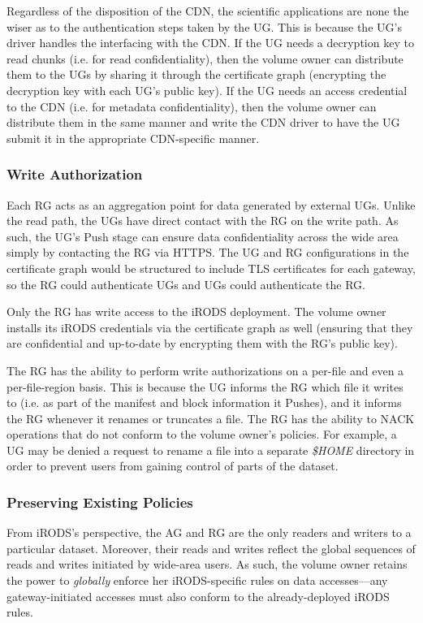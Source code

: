 Regardless of the disposition of the CDN, the scientific applications are none
the wiser as to the authentication steps taken by the UG.  This is
because the UG's driver handles the interfacing with the CDN.  If the
UG needs a decryption key to read chunks (i.e. for read confidentiality), then
the volume owner can distribute them to the UGs by sharing it through the
certificate graph (encrypting the decryption key with each UG's public key).  If
the UG needs an access credential to the CDN (i.e. for metadata
confidentiality), then the volume owner can distribute them in the same manner
and write the CDN driver to have the UG submit it in the appropriate
CDN-specific manner.

\subsubsection{Write Authorization}

Each RG acts as an aggregation point for data generated by external UGs.
Unlike the read path, the UGs have direct contact with the RG on the write path.
As such, the UG's Push stage can ensure data confidentiality across the wide
area simply by contacting the RG via HTTPS.  The UG and RG configurations in the
certificate graph would be structured to include TLS certificates for each
gateway, so the RG could authenticate UGs and UGs could authenticate the RG.

Only the RG has write access to the iRODS deployment.  The volume owner installs its
iRODS credentials via the certificate graph as well (ensuring that they are
confidential and up-to-date by encrypting them with the RG's public key).

The RG has the ability to perform write authorizations on a per-file and even a
per-file-region basis.  This is because the UG informs the RG which file it
writes to (i.e. as part of the manifest and block information it Pushes), and it
informs the RG whenever it renames or truncates a file.  The RG has the ability
to NACK operations that do not conform to the volume owner's policies.  For
example, a UG may be denied a request to rename a file into a separate
\textit{\$HOME} directory in order to prevent users from gaining control of
parts of the dataset.

\subsubsection{Preserving Existing Policies}

From iRODS's perspective, the AG and RG are the only readers and writers to a
particular dataset.  Moreover, their reads and writes reflect the global
sequences of reads and writes initiated by wide-area users.  As such, the
volume owner retains the power to \emph{globally} enforce her iRODS-specific rules on data
accesses---any gateway-initiated accesses must also conform to the
already-deployed iRODS rules.

